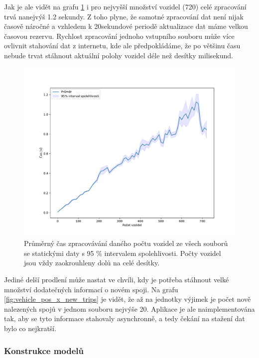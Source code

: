 \bigbreak


Jak je ale vidět na grafu \ref{fig:file_process_time} i pro nejvyšší množství vozidel (720) celé zpracování trvá nanejvýš 1.2 sekundy. Z toho plyne, že samotné zpracování dat není nijak časově náročné a vzhledem k 20sekundové periodě aktualizace dat máme velkou časovou rezervu. Rychlost zpracování jednoho vstupního souboru může více ovlivnit stahování dat z internetu, kde ale předpokládáme, že po většinu času nebude trvat stáhnout aktuální polohy vozidel déle než desítky milisekund.


\bigbreak


\begin{figure}
   \centering
 \includegraphics[width=\linewidth]{../img/file_process_time}
 \caption{Průměrný čas zpracovávání daného počtu vozidel ze všech souborů se statickými daty s 95 \% intervalem spolehlivosti. Počty vozidel jsou vždy zaokrouhleny dolů na celé desítky.}
 \label{fig:file_process_time}
\end{figure}


\bigbreak


Jediné delší prodlení může nastat ve chvíli, kdy je potřeba stáhnout velké množství dodatečných informací o novém spoji. Na grafu \ref{fig:vehicle_pos_x_new_trips} je vidět, že až na jednotky výjimek je počet nově nalezených spojů v jednom souboru nejvýše 20. Aplikace je ale naimplementována tak, aby se tyto informace stahovaly asynchronně, a tedy čekání na stažení dat bylo co nejkratší.


\subsubsection{Konstrukce modelů}



